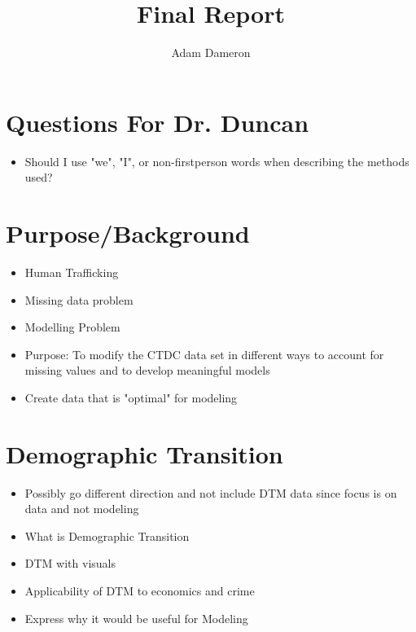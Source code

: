 \documentclass{article} %
\title{Final Report}
\author{
	Adam Dameron
}
\begin{document}
	
	
	\maketitle
	
	\begin{abstract}
		
	\end{abstract}
	
	\section{Questions For Dr. Duncan}
	\begin{itemize}
		\item Should I use "we", "I", or non-firstperson words when describing the methods used?
	\end{itemize}
	
	\section{Purpose/Background}
	\begin{itemize}
		\item Human Trafficking
		\item Missing data problem
		\item Modelling Problem
		\item Purpose: To modify the CTDC data set in different ways to account for missing values and to develop meaningful models
		\item Create data that is "optimal" for modeling
	\end{itemize}
	
	\section{Demographic Transition} 
	\begin{itemize}
		\item Possibly go different direction and not include DTM data since focus is on data and not modeling
		\item What is Demographic Transition
		\item DTM with visuals
		\item Applicability of DTM to economics and crime
		\item Express why it would be useful for Modeling
	\end{itemize}
	
	
\end{document}
